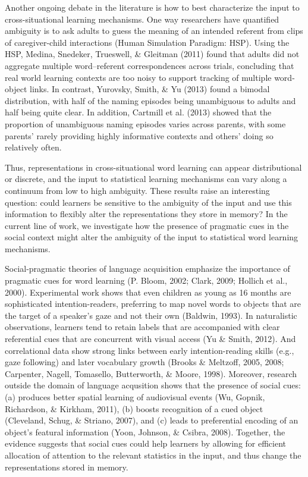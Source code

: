 \documentclass[a4paper,man,natbib]{apa6}
\begin{document}
Another ongoing debate in the literature is how to best characterize the
input to cross-situational learning mechanisms. One way researchers have
quantified ambiguity is to ask adults to guess the meaning of an
intended referent from clips of caregiver-child interactions (Human
Simulation Paradigm: HSP). Using the HSP, Medina, Snedeker, Trueswell,
\& Gleitman (2011) found that adults did not aggregate multiple
word--referent correspondences across trials, concluding that real world
learning contexts are too noisy to support tracking of multiple
word-object links. In contrast, Yurovsky, Smith, \& Yu (2013) found a
bimodal distribution, with half of the naming episodes being unambiguous
to adults and half being quite clear. In addition, Cartmill et al.
(2013) showed that the proportion of unambiguous naming episodes varies
across parents, with some parents' rarely providing highly informative
contexts and others' doing so relatively often.

Thus, representations in cross-situational word learning can appear
distributional or discrete, and the input to statistical learning
mechanisms can vary along a continuum from low to high ambiguity. These
results raise an interesting question: could learners be sensitive to
the ambiguity of the input and use this information to flexibly alter
the representations they store in memory? In the current line of work,
we investigate how the presence of pragmatic cues in the social context
might alter the ambiguity of the input to statistical word learning
mechanisms.

Social-pragmatic theories of language acquisition emphasize the
importance of pragmatic cues for word learning (P. Bloom, 2002; Clark,
2009; Hollich et al., 2000). Experimental work shows that even children
as young as 16 months are sophisticated intention-readers, preferring to
map novel words to objects that are the target of a speaker's gaze and
not their own (Baldwin, 1993). In naturalistic observations, learners
tend to retain labels that are accompanied with clear referential cues
that are concurrent with visual access (Yu \& Smith, 2012). And
correlational data show strong links between early intention-reading
skills (e.g., gaze following) and later vocabulary growth (Brooks \&
Meltzoff, 2005, 2008; Carpenter, Nagell, Tomasello, Butterworth, \&
Moore, 1998). Moreover, research outside the domain of language
acqusition shows that the presence of social cues: (a) produces better
spatial learning of audiovisual events (Wu, Gopnik, Richardson, \&
Kirkham, 2011), (b) boosts recognition of a cued object (Cleveland,
Schug, \& Striano, 2007), and (c) leads to preferential encoding of an
object's featural information (Yoon, Johnson, \& Csibra, 2008).
Together, the evidence suggests that social cues could help learners by
allowing for efficient allocation of attention to the relevant
statistics in the input, and thus change the representations stored in
memory.
\end{document}

